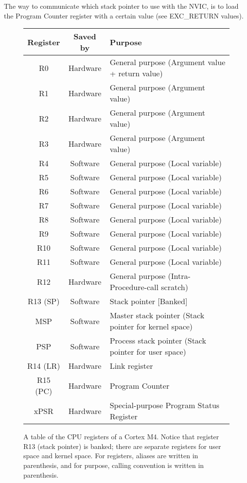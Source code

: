 The way to communicate which stack pointer to use with the NVIC, is to load the Program Counter register with a certain value (see EXC\_RETURN values). 
\begin{figure}
	\label{tab:registers}
	\centering
	\begin{tabular}{|c|c|p{10cm}|}
		\hline
		Register	&	Saved by	&	Purpose\\
		\hline
		R0			&	Hardware	&	General purpose (Argument value + return value)\\
		\hline
		R1 			&	Hardware	&	General purpose (Argument value)\\
		\hline
		R2 			&	Hardware	&	General purpose (Argument value)\\
		\hline
		R3 			&	Hardware	&	General purpose (Argument value)\\
		\hline
		R4 			&	Software	&	General purpose (Local variable)\\
		\hline
		R5 			&	Software	&	General purpose (Local variable)\\
		\hline
		R6 			&	Software	&	General purpose (Local variable)\\
		\hline
		R7 			&	Software	&	General purpose (Local variable)\\
		\hline
		R8 			&	Software	&	General purpose (Local variable)\\
		\hline
		R9 			&	Software	&	General purpose (Local variable)\\
		\hline
		R10			&	Software	&	General purpose (Local variable)\\
		\hline
		R11			&	Software	&	General purpose (Local variable)\\
		\hline
		R12			&	Hardware	&	General purpose (Intra-Procedure-call scratch)\\
		\hline
		R13 (SP)	&	Software	&	Stack pointer [Banked]\\
		MSP			&	Software	&	Master stack pointer (Stack pointer for kernel space)\\
		PSP			&	Software	&	Process stack pointer (Stack pointer for user space)\\
		\hline
		R14 (LR)	&	Hardware	&	Link register\\
		\hline
		R15 (PC)	&	Hardware	&	Program Counter\\
		\hline
		xPSR		&	Hardware	& 	Special-purpose Program Status Register\\
		\hline
	\end{tabular}
	\caption{A table of the CPU registers of a Cortex M4. Notice that register R13 (stack pointer) is banked;
	there are separate registers for user space and kernel space.
	For registers, aliases are written in parenthesis, and for purpose, calling convention is written in parenthesis.}
\end{figure}

